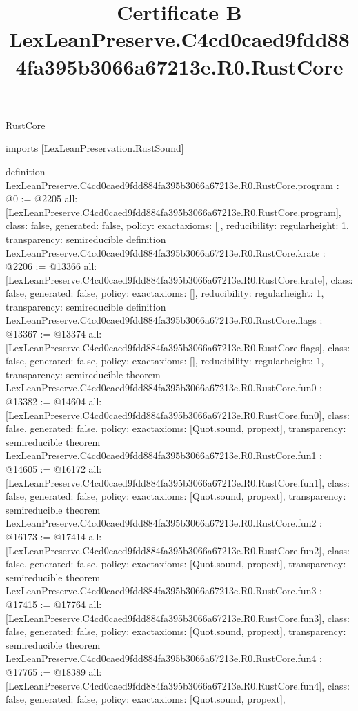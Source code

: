 \begin{lexlean}{RustCore}
\title{Certificate B LexLeanPreserve.C4cd0caed9fdd884fa395b3066a67213e.R0.RustCore}
\begin{coremodule}
imports [LexLeanPreservation.RustSound]

definition LexLeanPreserve.C4cd0caed9fdd884fa395b3066a67213e.R0.RustCore.program : @0 := @2205 {
  all: [LexLeanPreserve.C4cd0caed9fdd884fa395b3066a67213e.R0.RustCore.program],
  class: false,
  generated: false,
  policy: exact{axioms: []},
  reducibility: regular{height: 1},
  transparency: semireducible
}
definition LexLeanPreserve.C4cd0caed9fdd884fa395b3066a67213e.R0.RustCore.krate : @2206 := @13366 {
  all: [LexLeanPreserve.C4cd0caed9fdd884fa395b3066a67213e.R0.RustCore.krate],
  class: false,
  generated: false,
  policy: exact{axioms: []},
  reducibility: regular{height: 1},
  transparency: semireducible
}
definition LexLeanPreserve.C4cd0caed9fdd884fa395b3066a67213e.R0.RustCore.flags : @13367 := @13374 {
  all: [LexLeanPreserve.C4cd0caed9fdd884fa395b3066a67213e.R0.RustCore.flags],
  class: false,
  generated: false,
  policy: exact{axioms: []},
  reducibility: regular{height: 1},
  transparency: semireducible
}
theorem LexLeanPreserve.C4cd0caed9fdd884fa395b3066a67213e.R0.RustCore.fun0 : @13382 := @14604 {
  all: [LexLeanPreserve.C4cd0caed9fdd884fa395b3066a67213e.R0.RustCore.fun0],
  class: false,
  generated: false,
  policy: exact{axioms: [Quot.sound, propext]},
  transparency: semireducible
}
theorem LexLeanPreserve.C4cd0caed9fdd884fa395b3066a67213e.R0.RustCore.fun1 : @14605 := @16172 {
  all: [LexLeanPreserve.C4cd0caed9fdd884fa395b3066a67213e.R0.RustCore.fun1],
  class: false,
  generated: false,
  policy: exact{axioms: [Quot.sound, propext]},
  transparency: semireducible
}
theorem LexLeanPreserve.C4cd0caed9fdd884fa395b3066a67213e.R0.RustCore.fun2 : @16173 := @17414 {
  all: [LexLeanPreserve.C4cd0caed9fdd884fa395b3066a67213e.R0.RustCore.fun2],
  class: false,
  generated: false,
  policy: exact{axioms: [Quot.sound, propext]},
  transparency: semireducible
}
theorem LexLeanPreserve.C4cd0caed9fdd884fa395b3066a67213e.R0.RustCore.fun3 : @17415 := @17764 {
  all: [LexLeanPreserve.C4cd0caed9fdd884fa395b3066a67213e.R0.RustCore.fun3],
  class: false,
  generated: false,
  policy: exact{axioms: [Quot.sound, propext]},
  transparency: semireducible
}
theorem LexLeanPreserve.C4cd0caed9fdd884fa395b3066a67213e.R0.RustCore.fun4 : @17765 := @18389 {
  all: [LexLeanPreserve.C4cd0caed9fdd884fa395b3066a67213e.R0.RustCore.fun4],
  class: false,
  generated: false,
  policy: exact{axioms: [Quot.sound, propext]},
}
\end{coremodule}
\end{lexlean}
